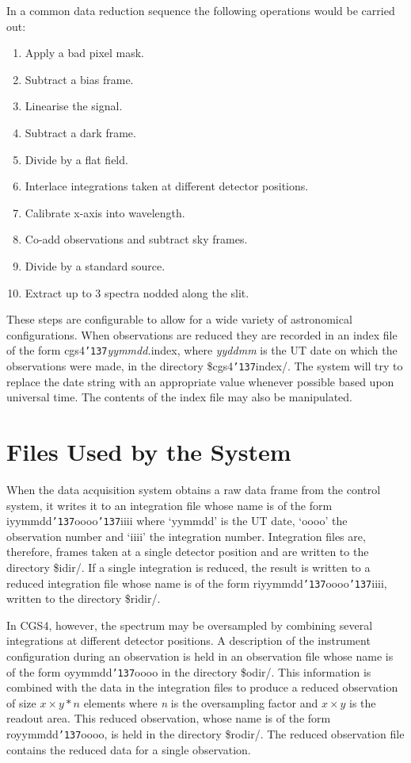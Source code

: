 \documentclass[a4paper]{book}
\renewcommand{\_}{{\tt\char'137}}
\begin{document}
In a common data reduction sequence the following operations would be
carried out: 

\begin{enumerate}
\item Apply a bad pixel mask.
\item Subtract a {\sc bias} frame.
\item Linearise the signal.
\item Subtract a {\sc dark} frame.
\item Divide by a {\sc flat} field.
\item Interlace integrations taken at different detector positions.
\item Calibrate x-axis into wavelength.
\item Co-add observations and subtract {\sc sky} frames.
\item Divide by a {\sc standard} source.
\item Extract up to 3 spectra nodded along the slit.
\end{enumerate}

These steps are configurable to allow for a wide variety of astronomical
configurations. When observations are reduced they are recorded in an
index file of the form {\sc cgs4\_}{\em yymmdd.}{\sc index}, where {\em
yyddmm} is the UT date on which the observations were made, in the
directory {\sc \$cgs4\_index/}. The system will try to replace the date
string with an appropriate value whenever possible based upon universal
time. The contents of the index file may also be manipulated. 

\section{Files Used by the System}
When the data acquisition system obtains a raw data frame from the control
system, it writes it to an integration file whose name is of the form
iyymmdd\_oooo\_iiii where `yymmdd' is the UT date, `oooo' the observation
number and `iiii' the integration number. Integration files are,
therefore, frames taken at a single detector position and are written to
the directory {\sc \$idir/}. If a single integration is reduced, the
result is written to a reduced integration file whose name is of the form
riyymmdd\_oooo\_iiii, written to the directory {\sc \$ridir/}. 

In CGS4, however, the spectrum may be oversampled by combining several
integrations at different detector positions. A description of the
instrument configuration during an observation is held in an observation
file whose name is of the form oyymmdd\_oooo in the directory {\sc
\$odir/}.  This information is combined with the data in the integration
files to produce a reduced observation of size $x \times y*n$ elements
where {\em n} is the oversampling factor and $x \times y$ is the readout
area.  This reduced observation, whose name is of the form royymmdd\_oooo,
is held in the directory {\sc \$rodir/}.  The reduced observation file
contains the reduced data for a single observation. 
\end{document}
